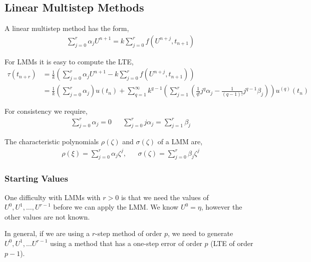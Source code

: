 \documentclass[12pt]{article}
\begin{document}
\subsection{Linear Multistep Methods}

\begin{definition}
A linear multistep method has the form,
\begin{align*}
    \sum_{j=0}^{r} \alpha_j U^{n+1} = k \sum_{j=0}^{r} f(U^{n+j},t_{n+1})
\end{align*}
\end{definition}

For LMMs it is easy to compute the LTE,
\begin{align*}
    \tau(t_{n+r}) &= \frac{1}{k} \left( \sum_{j=0}^{r} \alpha_j U^{n+1} - k \sum_{j=0}^{r} f(U^{n+j},t_{n+1}) \right) \\
    &= \frac{1}{k} \left( \sum_{j=0}^{r} \alpha_j \right) u(t_n) + \sum_{q=1}^{\infty} k^{q-1} \left( \sum_{j=1}^{r} \left( \frac{1}{q!}j^q \alpha_j - \frac{1}{(q-1)!}j^{q-1} \beta_j  \right) \right) u^{(q)}(t_n)
\end{align*}

For consistency we require,
\begin{align*}
    \sum_{j=0}^{r} \alpha_j  = 0 &&
    \sum_{j=0}^{r} j \alpha_j = \sum_{j=1}^{r} \beta_j
\end{align*}

\begin{definition}
The characteristic polynomials \( \rho(\zeta) \) and \( \sigma(\zeta) \) of a LMM are,
\begin{align*}
    \rho(\xi) = \sum_{j=0}^{r} \alpha_j \zeta^j, && \sigma(\zeta) = \sum_{j=0}^{r} \beta_j \zeta^j
\end{align*}
\end{definition}

\subsubsection{Starting Values}
One difficulty with LMMs with \( r>0 \) is that we need the values of \( U^0, U^1, \ldots, U^{r-1} \) before we can apply the LMM. We know \( U^0 = \eta \), however the other values are not known.


In general, if we are using a \( r \)-step method of order \( p \), we need to generate \( U^0, U^1, \ldots U^{r-1} \) using a method that has a one-step error of order \( p \) (LTE of order \( p-1 \)). 
\end{document}
